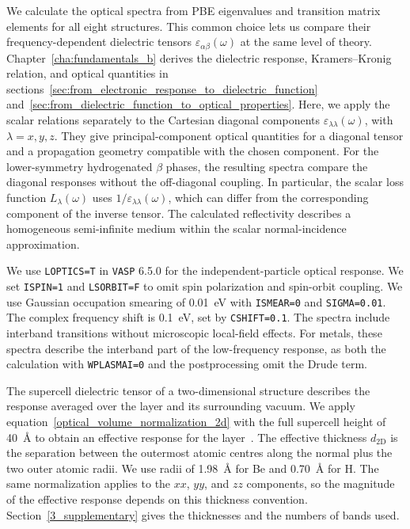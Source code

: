 We calculate the optical spectra from PBE eigenvalues and transition matrix elements for all eight structures.
This common choice lets us compare their frequency-dependent dielectric tensors $\varepsilon_{\alpha\beta}(\omega)$ at the same level of theory.
Chapter~\ref{cha:fundamentals_b} derives the dielectric response, Kramers--Kronig relation, and optical quantities in sections~\ref{sec:from_electronic_response_to_dielectric_function} and~\ref{sec:from_dielectric_function_to_optical_properties}.
Here, we apply the scalar relations separately to the Cartesian diagonal components $\varepsilon_{\lambda\lambda}(\omega)$, with $\lambda=x,y,z$.
They give principal-component optical quantities for a diagonal tensor and a propagation geometry compatible with the chosen component.
For the lower-symmetry hydrogenated $\beta$ phases, the resulting spectra compare the diagonal responses without the off-diagonal coupling.
In particular, the scalar loss function $L_{\lambda}(\omega)$ uses $1/\varepsilon_{\lambda\lambda}(\omega)$, which can differ from the corresponding component of the inverse tensor.
The calculated reflectivity describes a homogeneous semi-infinite medium within the scalar normal-incidence approximation.

We use \texttt{LOPTICS=T} in \texttt{VASP} 6.5.0 for the independent-particle optical response.
We set \texttt{ISPIN=1} and \texttt{LSORBIT=F} to omit spin polarization and spin-orbit coupling.
We use Gaussian occupation smearing of \qty{0.01}{\electronvolt} with \texttt{ISMEAR=0} and \texttt{SIGMA=0.01}.
The complex frequency shift is \qty{0.1}{\electronvolt}, set by \texttt{CSHIFT=0.1}.
The spectra include interband transitions without microscopic local-field effects.
For metals, these spectra describe the interband part of the low-frequency response, as both the calculation with \texttt{WPLASMAI=0} and the postprocessing omit the Drude term.

The supercell dielectric tensor of a two-dimensional structure describes the response averaged over the layer and its surrounding vacuum.
We apply equation~\eqref{optical_volume_normalization_2d} with the full supercell height of \qty{40}{\angstrom} to obtain an effective response for the layer~\cite{yang2021method}.
The effective thickness $d_\mathrm{2D}$ is the separation between the outermost atomic centres along the normal plus the two outer atomic radii.
We use radii of \qty{1.98}{\angstrom} for Be and \qty{0.70}{\angstrom} for H.
The same normalization applies to the $xx$, $yy$, and $zz$ components, so the magnitude of the effective response depends on this thickness convention.
Section~\ref{3_supplementary} gives the thicknesses and the numbers of bands used.

